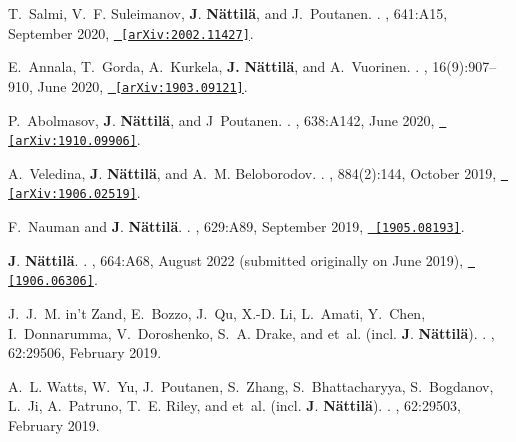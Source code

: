 \documentclass[letterpaper, onecolumn, 11pt]{article}
\begin{document}
\begin{thebibliography}{10}
T.~{Salmi}, V.~F. {Suleimanov}, \textbf{J}. \textbf{N{\"a}ttil{\"a}}, and
  J.~{Poutanen}.
.
\newblock {\em \aap}, 641:A15, September 2020,
  \href{http://arxiv.org/abs/2002.11427}{\nolinkurl{ [arXiv:2002.11427]}}.

E.~{Annala}, T.~{Gorda}, A.~{Kurkela}, \textbf{J.} \textbf{{N{\"a}ttil{\"a}}},
  and A.~{Vuorinen}.
.
, 16(9):907--910, June 2020,
  \href{http://arxiv.org/abs/1903.09121}{\nolinkurl{ [arXiv:1903.09121]}}.

P.~{Abolmasov}, \textbf{J}. \textbf{N{\"a}ttil{\"a}}, and J~{Poutanen}.
.
\newblock {\em \aap}, 638:A142, June 2020,
  \href{http://arxiv.org/abs/1910.09906}{\nolinkurl{ [arXiv:1910.09906]}}.

A.~{Veledina}, \textbf{J}. \textbf{N{\"a}ttil{\"a}}, and A.~M. {Beloborodov}.
.
\newblock {\em \apj}, 884(2):144, October 2019,
  \href{http://arxiv.org/abs/1906.02519}{\nolinkurl{ [arXiv:1906.02519]}}.

F.~{Nauman} and \textbf{J}. \textbf{N{\"a}ttil{\"a}}.
.
\newblock {\em \aap}, 629:A89, September 2019,
  \href{http://arxiv.org/abs/1905.08193}{\nolinkurl{ [1905.08193]}}.

\textbf{J}. \textbf{N{\"a}ttil{\"a}}.
.
, 664:A68, August 2022 (submitted originally on June 2019),
  \href{http://arxiv.org/abs/1906.06306}{\nolinkurl{ [1906.06306]}}.

J.~J.~M. {in't Zand}, E.~{Bozzo}, J.~{Qu}, X.-D. {Li}, L.~{Amati}, Y.~{Chen},
  I.~{Donnarumma}, V.~{Doroshenko}, S.~A. {Drake}, and {et~al. (incl.
  \textbf{J}. \textbf{{N{\"a}ttil{\"a}}})}.
.
, 62:29506,
  February 2019.

A.~L. {Watts}, W.~{Yu}, J.~{Poutanen}, S.~{Zhang}, S.~{Bhattacharyya},
  S.~{Bogdanov}, L.~{Ji}, A.~{Patruno}, T.~E. {Riley}, and {et~al. (incl.
  \textbf{J}. \textbf{{N{\"a}ttil{\"a}}})}.
.
, 62:29503,
  February 2019.


\end{thebibliography}
\end{document}
